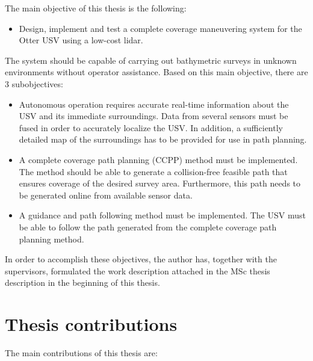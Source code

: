 The main objective of this thesis is the following:

\begin{itemize}[label=]

\item Design, implement and test a complete coverage maneuvering system for the Otter USV using a low-cost lidar.

\end{itemize}

\noindent The system should be capable of carrying out bathymetric surveys in unknown environments without operator assistance. Based on this main objective, there are 3 subobjectives:

\begin{itemize}[label=]

\item Autonomous operation requires accurate real-time information about the USV and its immediate surroundings. Data from several sensors must be fused in order to accurately localize the USV. In addition, a sufficiently detailed map of the surroundings has to be provided for use in path planning.

\item A complete coverage path planning (CCPP) method must be implemented. The method should be able to generate a collision-free feasible path that ensures coverage of the desired survey area. Furthermore, this path needs to be generated online from available sensor data.

\item A guidance and path following method must be implemented. The USV must be able to follow the path generated from the complete coverage path planning method.

\end{itemize}

\noindent In order to accomplish these objectives, the author has, together with the supervisors, formulated the work description attached in the MSc thesis description in the beginning of this thesis.

\section{Thesis contributions}

The main contributions of this thesis are:

